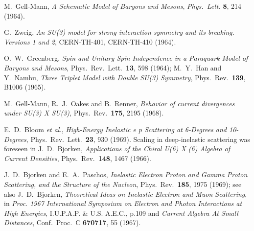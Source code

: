 \documentclass{ws-rv975x65}[12pt]
\begin{document}
\begin{thebibliography}{9}

M.~Gell-Mann,
{\it A Schematic Model of Baryons and Mesons},
  \emph{Phys.\ Lett.}  {\bf 8}, 214 (1964).
  
G.~Zweig,
{\it An SU(3) model for strong interaction symmetry and its breaking. Versions 1 and 2},
  CERN-TH-401, CERN-TH-410 (1964).

O.~W.~Greenberg,
{\it Spin and Unitary Spin Independence in a Paraquark Model of Baryons and Mesons},
  Phys.\ Rev.\ Lett.\  {\bf 13}, 598 (1964);
M.~Y.~Han and Y.~Nambu,
{\it Three Triplet Model with Double SU(3) Symmetry},
  Phys.\ Rev.\  {\bf 139}, B1006 (1965).
  
M.~Gell-Mann, R.~J.~Oakes and B.~Renner,
{\it Behavior of current divergences under SU(3) X SU(3)},
  Phys.\ Rev.\  {\bf 175}, 2195 (1968).

E.~D.~Bloom {\it et al.},
{\it High-Energy Inelastic e p Scattering at 6-Degrees and 10-Degrees},
  Phys.\ Rev.\ Lett.\  {\bf 23}, 930 (1969).
Scaling in deep-inelastic scattering was foreseen in
J.~D.~Bjorken,
{\it Applications of the Chiral U(6) X (6) Algebra of Current Densities},
  Phys.\ Rev.\  {\bf 148}, 1467 (1966).

J.~D.~Bjorken and E.~A.~Paschos,
{\it Inelastic Electron Proton and Gamma Proton Scattering, and the Structure of the Nucleon},
  Phys.\ Rev.\  {\bf 185}, 1975 (1969); see also
J.~D.~Bjorken, {\it Theoretical Ideas on Inelastic Electron and Muon Scattering}, in
{\it Proc. 1967 International Symposium on Electron and Photon Interactions at High Energies}, I.U.P.A.P. \& U.S. A.E.C., p.109 and
{\it Current Algebra At Small Distances},
  Conf.\ Proc.\ C {\bf 670717}, 55 (1967).
  

\end{thebibliography}
\end{document}
